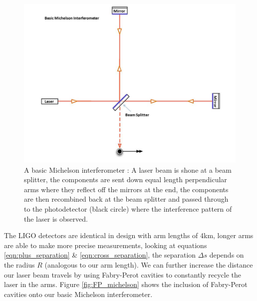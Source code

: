 \begin{figure}
   \includegraphics[width=\textwidth]{images/1_general_relativity/Basic_michelson_labeled.jpg}
   \caption{\label{fig:basic_michelson}A basic Michelson interferometer \cite{ligo_ifo}: A laser beam is shone at a beam splitter, the components are sent down equal length perpendicular arms where they reflect off the mirrors at the end, the components are then recombined back at the beam splitter and passed through to the photodetector (black circle) where the interference pattern of the laser is observed.}
\end{figure}

The LIGO detectors are identical in design with arm lengths of 4km, longer arms are able to make more precise measurements, looking at equations \ref{eqn:plus_separation} \& \ref{eqn:cross_separation}, the separation
$\Delta s$ depends on the radius $R$ (analogous to our arm length). We can further increase the distance our laser beam travels by using Fabry-Perot cavities to constantly recycle the laser in the arms. Figure \ref{fig:FP_michelson} shows the inclusion of Fabry-Perot cavities onto our basic Michelson interferometer.

